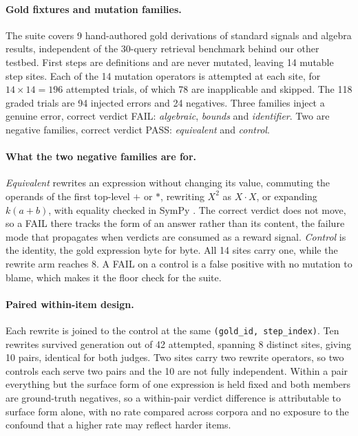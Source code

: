 \paragraph{Gold fixtures and mutation families.}
The suite covers 9 hand-authored gold derivations of standard signals and
algebra results, independent of the 30-query retrieval benchmark behind our
other testbed. First steps are definitions and are never mutated, leaving 14
mutable step sites. Each of the 14 mutation operators is attempted at each
site, for $14 \times 14 = 196$ attempted trials, of which 78 are inapplicable
and skipped. The 118 graded trials are 94 injected errors and 24 negatives.
Three families inject a genuine error, correct verdict FAIL: \emph{algebraic},
\emph{bounds} and \emph{identifier}. Two are negative families, correct verdict
PASS: \emph{equivalent} and \emph{control}.

\paragraph{What the two negative families are for.}
\emph{Equivalent} rewrites an expression without changing its value, commuting
the operands of the first top-level $+$ or $*$, rewriting $X^2$ as
$X \cdot X$, or expanding $k(a+b)$, with equality checked in SymPy
\citep{meurer2017sympy}. The correct verdict does not move, so a FAIL there
tracks the form of an answer rather than its content, the failure mode that
propagates when verdicts are consumed as a reward signal. \emph{Control} is the
identity, the gold expression byte for byte. All 14 sites carry one, while the
rewrite arm reaches 8. A FAIL on a control is a false positive with no mutation
to blame, which makes it the floor check for the suite.

\paragraph{Paired within-item design.}
Each rewrite is joined to the control at the same
\texttt{(gold\_id, step\_index)}. Ten rewrites survived generation out of 42
attempted, spanning 8 distinct sites, giving 10 pairs, identical for both
judges. Two sites carry two rewrite operators, so two controls each serve two
pairs and the 10 are not fully independent. Within a pair everything but the
surface form of one expression is held fixed and both members are ground-truth
negatives, so a within-pair verdict difference is attributable to surface form
alone, with no rate compared across corpora and no exposure to the confound
that a higher rate may reflect harder items.

